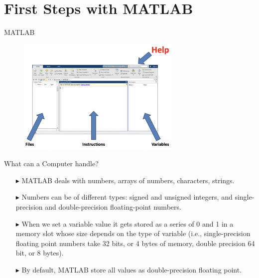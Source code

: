 \documentclass[xcolor={dvipsnames,rgb}, aspectratio=169]{beamer}
\begin{document}
\section{First Steps with MATLAB}
\begin{frame}{MATLAB}
    \begin{figure}
        \centering
        \includegraphics[width=0.7\textwidth]{Figures/MATLAB-2.png}
    \end{figure}
\end{frame}

\begin{frame}{What can a Computer handle?}
    \begin{itemize}
        \item[$\blacktriangleright$] MATLAB deals with numbers, arrays of numbers, characters,
              strings.
        \item[$\blacktriangleright$] Numbers can be of different types: signed and unsigned
              integers, and single-precision and double-precision floating-point numbers.
        \item[$\blacktriangleright$] When we set a variable value it gets stored as a series
              of 0 and 1 in a memory slot whose size depends on the type of variable (i.e.,
              single-precision floating point numbers take 32 bits, or 4 bytes of memory, double
              precision 64 bit, or 8 bytes).
        \item[$\blacktriangleright$] By default, MATLAB store all values as double-precision
              floating point.
    \end{itemize}
\end{frame}
\end{document}
